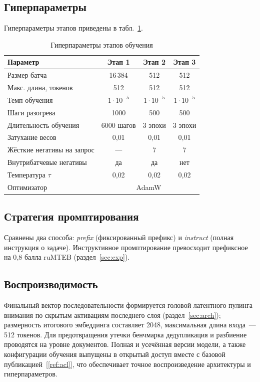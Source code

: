 \documentclass[12pt,a4paper]{article}
\begin{document}
\subsection{Гиперпараметры}
Гиперпараметры этапов приведены в табл.~\ref{tab:hp}.
\begin{table}[ht]
  \centering
  \caption{Гиперпараметры этапов обучения}\label{tab:hp}
  \begin{tabular}{lccc}
    \toprule
    Параметр & Этап 1 & Этап 2 & Этап 3 \\
    \midrule
    Размер батча                & 16\,384 & 512 & 512 \\
    Макс. длина, токенов        & 512 & 512 & 512 \\
    Темп обучения               & $1{\cdot}10^{-5}$ & $1{\cdot}10^{-5}$ & $1{\cdot}10^{-5}$ \\
    Шаги разогрева              & 1000 & 500 & 500 \\
    Длительность обучения       & 6000 шагов & 3 эпохи & 3 эпохи \\
    Затухание весов             & 0{,}01 & 0{,}01 & 0{,}01 \\
    Жёсткие негативы на запрос  & ---  & 7 & 7 \\
    Внутрибатчевые негативы     & да   & да & нет \\
    Температура $\tau$          & 0{,}02 & 0{,}02 & 0{,}02 \\
    Оптимизатор                 & \multicolumn{3}{c}{AdamW} \\
    \bottomrule
  \end{tabular}
\end{table}

\subsection{Стратегия промптирования}
Сравнены два способа: \textit{prefix} (фиксированный префикс) и \textit{instruct}
(полная инструкция о задаче). Инструктивное промптирование превосходит
префиксное на 0{,}8 балла ruMTEB (раздел~\ref{sec:exp}).

\subsection{Воспроизводимость}
Финальный вектор последовательности формируется головой латентного пулинга
внимания по скрытым активациям последнего слоя (раздел~\ref{sec:arch});
размерность итогового эмбеддинга составляет 2048, максимальная длина входа~---
512 токенов. Для предотвращения утечки бенчмарка дедупликация и разбиение
проводятся на уровне документов. Полная и усечённая версии модели, а также
конфигурации обучения выпущены в открытый доступ вместе с базовой
публикацией~[\ref{ref:acl}], что обеспечивает точное воспроизведение архитектуры
и гиперпараметров.
\end{document}
